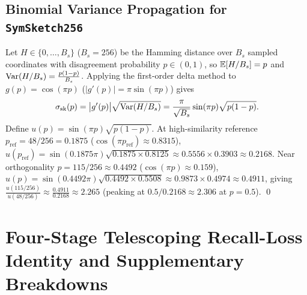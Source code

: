 \subsection{Binomial Variance Propagation for \texttt{SymSketch256}}
Let $H \in \{0, \dots, B_s\}$ ($B_s = 256$) be the Hamming distance over $B_s$ sampled coordinates with disagreement probability $p \in (0, 1)$, so $\mathbb{E}[H/B_s] = p$ and $\operatorname{Var}(H/B_s) = \frac{p(1 - p)}{B_s}$.
Applying the first-order delta method to $g(p) = \cos(\pi p)$ ($|g'(p)| = \pi\sin(\pi p)$) gives
\begin{equation}
  \sigma_{\mathrm{sk}}(p) = \bigl|g'(p)\bigr|\sqrt{\operatorname{Var}(H/B_s)} = \frac{\pi}{\sqrt{B_s}}\sin(\pi p)\sqrt{p(1 - p)}.
\end{equation}
Define $u(p) = \sin(\pi p)\sqrt{p(1 - p)}$.
At high-similarity reference $p_{\mathrm{ref}} = 48 / 256 = 0.1875$ ($\cos(\pi p_{\mathrm{ref}}) \approx 0.8315$), $u(p_{\mathrm{ref}}) = \sin(0.1875\pi)\sqrt{0.1875 \times 0.8125} \approx 0.5556 \times 0.3903 \approx 0.2168$.
Near orthogonality $p = 115 / 256 \approx 0.4492$ ($\cos(\pi p) \approx 0.159$), $u(p) = \sin(0.4492\pi)\sqrt{0.4492 \times 0.5508} \approx 0.9873 \times 0.4974 \approx 0.4911$, giving $\frac{u(115/256)}{u(48/256)} \approx \frac{0.4911}{0.2168} \approx 2.265$ (peaking at $0.5 / 0.2168 \approx 2.306$ at $p = 0.5$). \qed

\section{Four-Stage Telescoping Recall-Loss Identity and Supplementary Breakdowns}
\label{app:loss_decomposition}

